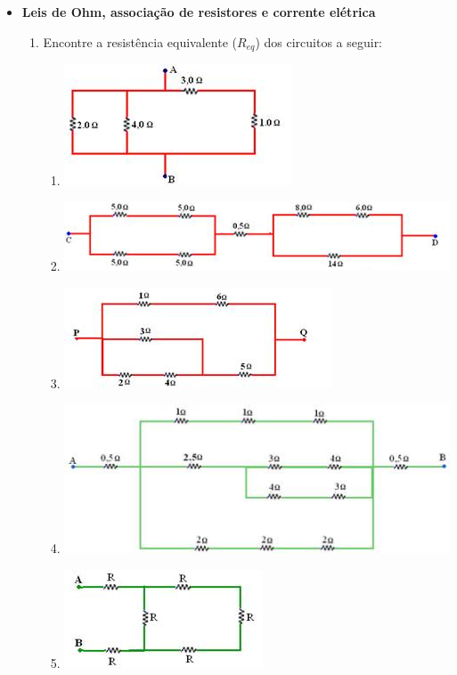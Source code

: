 \documentclass[12pt,letterpaper,fleqn]{article}
\begin{document}
    \begin{itemize}
        \item \textbf{Leis de Ohm, associação de resistores e corrente elétrica}
        \begin{enumerate}
            \item Encontre a resistência equivalente ($R_{eq}$) dos circuitos a seguir:
            \begin{enumerate}
                \item \includegraphics[]{circuito_1.jpg}
                \item \includegraphics[]{circuito_2.jpg}
                \item \includegraphics[]{circuito_3.jpg}
                \item \includegraphics[]{circuito_4.jpg}
                \item \includegraphics[]{circuito_5.jpg}

\end{enumerate}
\end{enumerate}
\end{itemize}
\end{document}
